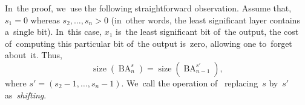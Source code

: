 \documentclass[a4paper, UKenglish, cleveref, autoref,  thm-restate, anonymous]{lipics-v2021}
\DeclareMathOperator{\BA}{BA}
\begin{document}
    In~the proof, we~use the following straightforward observation.
    Assume that, $s_1=0$ whereas $s_2, \dotsc, s_n>0$ (in~other words, the least significant layer contains a~single bit).
    In~this case, $x_1$ is~the least significant bit of~the output,
    the cost of~computing this particular bit of~the output is~zero,
    allowing one to~forget about~it. Thus,
    \[\operatorname{size}(\BA^s_n)=\operatorname{size}(\BA^{s'}_{n-1}),\]
    where $s'=(s_2-1,\dotsc, s_n-1)$. We~call the operation of~
    replacing~$s$ by~$s'$
    as~\emph{shifting}.



%
%
%
%
\end{document}
